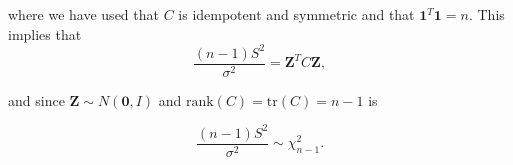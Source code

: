 where we have used that $C$ is idempotent and symmetric and that $\boldsymbol{1}^T\boldsymbol{1} = n$. This implies that 
\begin{equation*}
    \frac{(n-1)S^2}{\sigma^2} = \boldsymbol{Z}^TC\boldsymbol{Z},
\end{equation*}

and since $\boldsymbol{Z} \sim N(\boldsymbol{0}, I)$ and $\text{rank}(C) = \text{tr}(C) = n - 1$ is 

\begin{equation*}
    \frac{(n-1)S^2}{\sigma^2} \sim \chi_{n-1}^2.
\end{equation*}